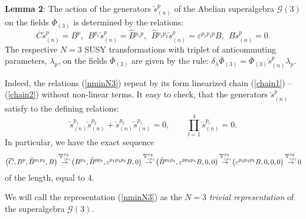 \documentclass[10pt]{article}
\begin{document}
\noindent
\textbf{Lemma 2}: The action of the generators  $\overleftarrow{s}{}^p_{(n)}$ of the Abelian superalgebra $\mathcal{G}(3)$ on the fields $\overline{\Phi}_{(3)}$ is determined by the relations:
 \begin{equation}\label{nminN3}
\overline{C}\overleftarrow{s}{}^p_{(n)} =  B^p, \ \  B^{p_1}\overleftarrow{s}{}^p_{(n)} =
  \widehat{B}{}^{p_1p},\ \  \widehat{B}{}^{p_1p_2} \overleftarrow{s}{}^p_{(n)} = \varepsilon^{p_1p_2p}B,\ \ {B}\overleftarrow{s}{}^p_{(n)} =0. \end{equation}
The respective $N=3$ SUSY transformations with triplet of anticommuting parameters, $\lambda_p$, on the fields $\overline{\Phi}_{(3)}$  are given by the rule: $\delta_\lambda \overline{\Phi}_{(3)} = \overline{\Phi}_{(3)} \overleftarrow{s}{}^{p}_{(n)} \lambda_p $.

\vspace{1ex}
\noindent
Indeed, the relations (\ref{nminN3})  repeat  by its form linearized chain (\ref{chain1}) --(\ref{chain2}) without non-linear terms.
It easy to check, that the generators $\overleftarrow{s}{}^{p}_{(n)}$ satisfy to the defining relations:
\begin{equation}\label{defnm}
  \overleftarrow{s}{}^{p_1}_{(n)}\overleftarrow{s}{}^{p_2}_{(n)}+\overleftarrow{s}{}^{p_2}_{(n)}\overleftarrow{s}{}^{p_1}_{(n)}=0,\qquad \prod_{l=1}^4\overleftarrow{s}{}^{p_l}_{(n)}=0.
\end{equation}
In particular, we have the exact sequence
\begin{equation}\label{exseqnm}
  \big( \overline{C}, B^{p}, \widehat{B}{}^{p_1p_2}, B \big) \hspace{-0.15em}\stackrel{\overleftarrow{s}{}^{p_3}_{(n)}}{\to} \hspace{-0.15em}\big(  B^{p_3}, \widehat{B}{}^{pp_3}, \varepsilon^{p_1p_2p_3}B,0 \big)\hspace{-0.15em}\stackrel{\overleftarrow{s}{}^{p_4}_{(n)}}{\to} \hspace{-0.15em}\big(   \widehat{B}{}^{p_3p_4}, \varepsilon^{pp_3p_4}B,0,0 \big)\hspace{-0.15em}\stackrel{\overleftarrow{s}{}^{p_5}_{(n)}}{\to} \hspace{-0.15em}\big(  \varepsilon^{p_3p_4p_5}B, 0,0,0 \big)\hspace{-0.15em}\stackrel{\overleftarrow{s}{}^{p_6}_{(n)}}{\to} \hspace{-0.15em}0
\end{equation}
of the length, equal to $4$.

We will call the representation (\ref{nminN3}) as the $N=3$ \emph{trivial representation}  of the  superalgebra $\mathcal{G}(3)$.
\end{document}
